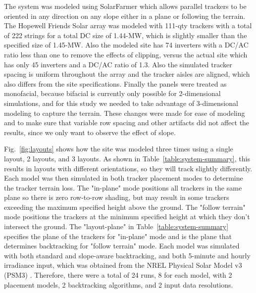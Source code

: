\documentclass[conference]{IEEEtran}
\begin{document}
The system was modeled using SolarFarmer \cite{Mikofski_8547323} which allows parallel trackers to be oriented in any direction on any slope either in a plane or following the terrain. The Hopewell Friends Solar array was modeled with 111-qty trackers with a total of 222 strings for a total DC size of 1.44-MW, which is slightly smaller than the specified size of 1.45-MW. Also the modeled site has 74 inverters with a DC/AC ratio less than one to remove the effects of clipping, versus the actual site which has only 45 inverters and a DC/AC ratio of 1.3. Also the simulated tracker spacing is uniform throughout the array and the tracker aisles are aligned, which also differs from the site specifications. Finally the panels were treated as monofacial, because bifacial is currently only possible for 2-dimensional simulations, and for this study we needed to take advantage of 3-dimensional modeling to capture the terrain. These changes were made for ease of modeling and to make sure that variable row spacing and other artifacts did not affect the results, since we only want to observe the effect of slope.

Fig.~\ref{fig:layouts} shows how the site was modeled three times using a single layout, 2 layouts, and 3 layouts. As shown in Table~\ref{table:system-summary}, this results in layouts with different orientations, so they will track slightly differently. Each model was then simulated in both tracker placement modes to determine the tracker terrain loss. The "in-plane" mode positions all trackers in the same plane so there is zero row-to-row shading, but may result in some trackers exceeding the maximum specified height above the ground. The "follow terrain" mode positions the trackers at the minimum specified height at which they don't intersect the ground. The "layout-plane" in Table~\ref{table:system-summary} specifies the plane of the trackers for "in-plane" mode and is the plane that determines backtracking for "follow terrain" mode. Each model was simulated with both standard \cite{Marion2013} and slope-aware \cite{Anderson2020} backtracking, and both 5-minute and hourly irradiance input, which was obtained from the NREL Physical Solar Model v3 (PSM3) \cite{Sengupta2018}. Therefore, there were a total of 24 runs, 8 for each model, with 2 placement models, 2 backtracking algorithms, and 2 input data resolutions.
\end{document}
